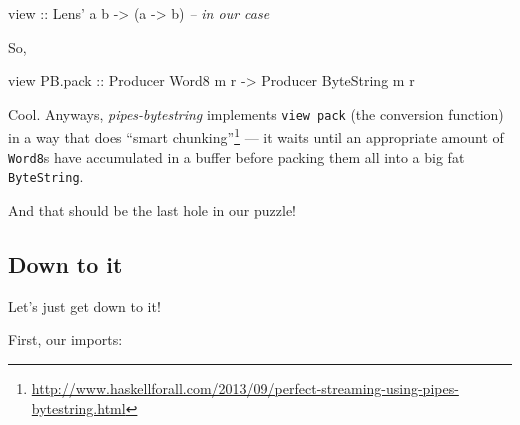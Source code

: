 \documentclass[]{article}
\newenvironment{Shaded}{\begin{snugshade}}{\end{snugshade}}
\newcommand{\CommentTok}[1]{\textcolor[rgb]{0.56,0.35,0.01}{\textit{#1}}}
\newcommand{\DataTypeTok}[1]{\textcolor[rgb]{0.13,0.29,0.53}{#1}}
\newcommand{\NormalTok}[1]{#1}
\newcommand{\OtherTok}[1]{\textcolor[rgb]{0.56,0.35,0.01}{#1}}
\renewcommand{\href}[2]{#2\footnote{\url{#1}}}
\begin{document}
\begin{Shaded}
\begin{Highlighting}[]
\OtherTok{view ::} \DataTypeTok{Lens'}\NormalTok{ a b }\OtherTok{->}\NormalTok{ (a }\OtherTok{->}\NormalTok{ b)       }\CommentTok{-- in our case}
\end{Highlighting}
\end{Shaded}

So,

\begin{Shaded}
\begin{Highlighting}[]
\NormalTok{view PB.pack}\OtherTok{ ::} \DataTypeTok{Producer} \DataTypeTok{Word8}\NormalTok{      m r}
             \OtherTok{->} \DataTypeTok{Producer} \DataTypeTok{ByteString}\NormalTok{ m r}
\end{Highlighting}
\end{Shaded}

Cool. Anyways, \emph{pipes-bytestring} implements \texttt{view\ pack} (the
conversion function) in a way that does
\href{http://www.haskellforall.com/2013/09/perfect-streaming-using-pipes-bytestring.html}{``smart
chunking''} --- it waits until an appropriate amount of \texttt{Word8}s have
accumulated in a buffer before packing them all into a big fat
\texttt{ByteString}.

And that should be the last hole in our puzzle!

\hypertarget{down-to-it}{%
\subsection{Down to it}\label{down-to-it}}

Let's just get down to it!

First, our imports:
\end{document}
